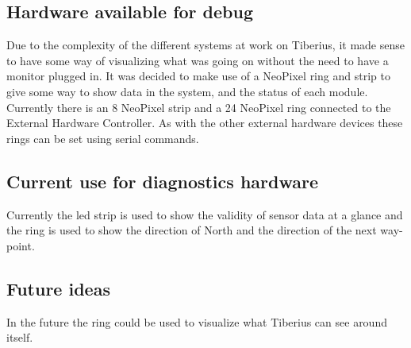 \label{diagnostics}
\subsection{Hardware available for debug}
Due to the complexity of the different systems at work on Tiberius, it made sense to have some way of visualizing what was going on without the need to have a monitor plugged in.
\newline
It was decided to make use of a NeoPixel ring and strip to give some way to show data in the system, and the status of each module.
\newline
Currently there is an 8 NeoPixel strip and a 24 NeoPixel ring connected to the External Hardware Controller. As with the other external hardware devices these rings can be set using serial commands.

\subsection{Current use for diagnostics hardware}
Currently the led strip is used to show the validity of sensor data at a glance and the ring is used to show the direction of North and the direction of the next way-point.
\subsection{Future ideas}
In the future the ring could be used to visualize what Tiberius can see around itself.
\pagestyle{euan}













